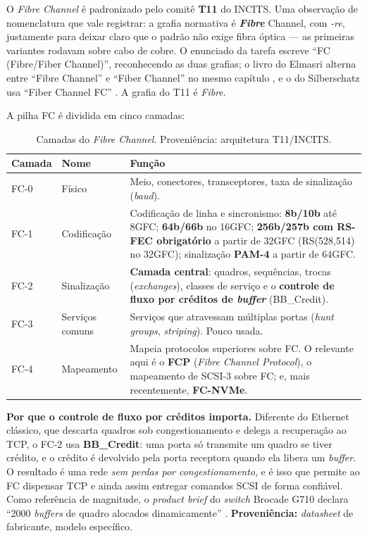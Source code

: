 \documentclass[11pt,a4paper]{article}
\begin{document}
O \textit{Fibre Channel} é padronizado pelo comitê \textbf{T11} do INCITS. Uma observação de
nomenclatura que vale registrar: a grafia normativa é \textbf{\textit{Fibre}} Channel, com
\textit{-re}, justamente para deixar claro que o padrão não exige fibra óptica --- as primeiras
variantes rodavam sobre cabo de cobre. O enunciado da tarefa escreve ``FC (Fibre/Fiber Channel)'',
reconhecendo as duas grafias; o livro do Elmasri alterna entre ``Fibre Channel'' e ``Fiber
Channel'' no mesmo capítulo \cite{elmasri2018}, e o do Silberschatz usa ``Fiber Channel FC''
\cite{silberschatz2020}. A grafia do T11 é \textit{Fibre}.

A pilha FC é dividida em cinco camadas:

\begin{table}[H]
\centering
\caption{Camadas do \textit{Fibre Channel}. Proveniência: arquitetura T11/INCITS.}
\label{tab:fclayers}
{\footnotesize
\begin{tabular}{@{}llp{9.1cm}@{}}
\toprule
\textbf{Camada} & \textbf{Nome} & \textbf{Função} \\
\midrule
FC-0 & Físico & Meio, conectores, transceptores, taxa de sinalização (\textit{baud}). \\
FC-1 & Codificação & Codificação de linha e sincronismo: \textbf{8b/10b} até 8GFC;
\textbf{64b/66b} no 16GFC; \textbf{256b/257b com RS-FEC obrigatório} a partir de 32GFC
(RS(528,514) no 32GFC); sinalização \textbf{PAM-4} a partir de 64GFC. \\
FC-2 & Sinalização & \textbf{Camada central}: quadros, sequências, trocas
(\textit{exchanges}), classes de serviço e o \textbf{controle de fluxo por créditos de
\textit{buffer}} (BB\_Credit). \\
FC-3 & Serviços comuns & Serviços que atravessam múltiplas portas (\textit{hunt groups},
\textit{striping}). Pouco usada. \\
FC-4 & Mapeamento & Mapeia protocolos superiores sobre FC. O relevante aqui é o \textbf{FCP}
(\textit{Fibre Channel Protocol}), o mapeamento de SCSI-3 sobre FC; e, mais recentemente,
\textbf{FC-NVMe}. \\
\bottomrule
\end{tabular}}
\end{table}

\textbf{Por que o controle de fluxo por créditos importa.} Diferente do Ethernet clássico, que
descarta quadros sob congestionamento e delega a recuperação ao TCP, o FC-2 usa
\textbf{BB\_Credit}: uma porta só transmite um quadro se tiver crédito, e o crédito é devolvido
pela porta receptora quando ela libera um \textit{buffer}. O resultado é uma rede
\emph{sem perdas por congestionamento}, e é isso que permite ao FC dispensar TCP e ainda assim
entregar comandos SCSI de forma confiável. Como referência de magnitude, o \textit{product brief}
do \textit{switch} Brocade G710 declara ``2000 \textit{buffers} de quadro alocados dinamicamente''
\cite{brocadeg710}. \textbf{Proveniência:} \textit{datasheet} de fabricante, modelo específico.
\end{document}
